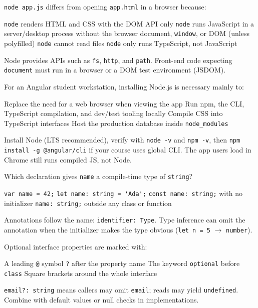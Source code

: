 \question[4]
\texttt{node app.js} differs from opening \texttt{app.html} in a browser because:
\begin{choices}
  \choice \texttt{node} renders HTML and CSS with the DOM API only
  \CorrectChoice \texttt{node} runs JavaScript in a server/desktop process without the browser document, \texttt{window}, or DOM (unless polyfilled)
  \choice \texttt{node} cannot read files
  \choice \texttt{node} only runs TypeScript, not JavaScript
\end{choices}
\begin{solution}
  Node provides APIs such as \texttt{fs}, \texttt{http}, and \texttt{path}. Front-end code expecting \texttt{document} must run in a browser or a DOM test environment (JSDOM).
\end{solution}

\question[4]
For an Angular student workstation, installing Node.js is necessary mainly to:
\begin{choices}
  \choice Replace the need for a web browser when viewing the app
  \CorrectChoice Run npm, the CLI, TypeScript compilation, and dev/test tooling locally
  \choice Compile CSS into TypeScript interfaces
  \choice Host the production database inside \texttt{node\_modules}
\end{choices}
\begin{solution}
  Install Node (LTS recommended), verify with \texttt{node -v} and \texttt{npm -v}, then \texttt{npm install -g @angular/cli} if your course uses global CLI. The app users load in Chrome still runs compiled JS, not Node.
\end{solution}

\question[4]
Which declaration gives \texttt{name} a compile-time type of \texttt{string}?
\begin{choices}
  \choice \lstinline[style=tsinline]|var name = 42;|
  \CorrectChoice \lstinline[style=tsinline]|let name: string = 'Ada';|
  \choice \lstinline[style=tsinline]|const name: string;| with no initializer
  \choice \lstinline[style=tsinline]|name: string;| outside any class or function
\end{choices}
\begin{solution}
  Annotations follow the name: \lstinline[style=tsinline]|identifier: Type|. Type inference can omit the annotation when the initializer makes the type obvious (\lstinline[style=tsinline]|let n = 5| $\rightarrow$ \texttt{number}).
\end{solution}

\question[4]
Optional interface properties are marked with:
\begin{choices}
  \choice A leading \texttt{@} symbol
  \CorrectChoice \lstinline[style=tsinline]|?| after the property name
  \choice The keyword \lstinline[style=tsinline]|optional| before \lstinline[style=tsinline]|class|
  \choice Square brackets around the whole interface
\end{choices}
\begin{solution}
  \lstinline[style=tsinline]|email?: string| means callers may omit \texttt{email}; reads may yield \lstinline[style=tsinline]|undefined|. Combine with default values or null checks in implementations.
\end{solution}

